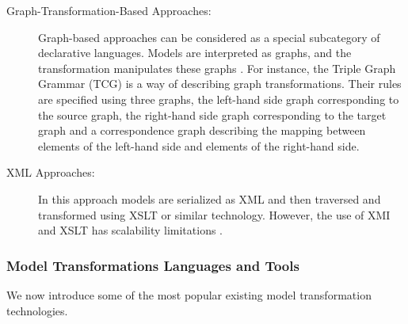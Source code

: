 \begin{description}
\item[Graph-Transformation-Based Approaches:]
Graph-based approaches can be considered as a special subcategory of declarative languages. Models are interpreted as graphs, and the transformation manipulates these graphs \cite{GraphTransformations2006}. For instance, the Triple Graph Grammar (TCG) \cite{GraphTransformations2006} is a way of describing graph transformations. Their rules are specified using three graphs, the left-hand side graph corresponding to the source graph, the right-hand side graph corresponding to the target graph and a correspondence graph describing the mapping between elements of the left-hand side and elements of the right-hand side.

\item[XML Approaches:]
In this approach models are serialized as XML and then traversed and transformed using XSLT or similar technology. However, the use of XMI and XSLT has scalability limitations \cite{peltier2001mtrans}. 
\end{description}

\subsubsection{Model Transformations Languages and Tools}

We now introduce some of the most popular existing model transformation technologies.

